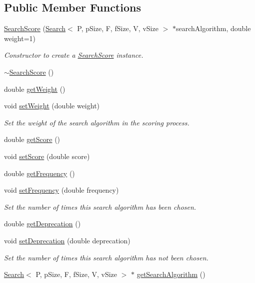 \subsection*{Public Member Functions}
\begin{DoxyCompactItemize}
\item 
\hyperlink{classSearchScore_a474b8d264518eac06879e0e8fa3668c3}{Search\+Score} (\hyperlink{classSearch}{Search}$<$ P, p\+Size, F, f\+Size, V, v\+Size $>$ $\ast$search\+Algorithm, double weight=1)
\begin{DoxyCompactList}\small\item\em Constructor to create a \hyperlink{classSearchScore}{Search\+Score} instance. \end{DoxyCompactList}\item 
\hyperlink{classSearchScore_ae19670231c559799e69ebc49b7a85ad8}{$\sim$\+Search\+Score} ()
\item 
double \hyperlink{classSearchScore_aa8a9d9b4946fc02c2243f38a226ae0e9}{get\+Weight} ()
\item 
void \hyperlink{classSearchScore_aaa8a0c4f0a91df62ccc7c8c1a6fc0612}{set\+Weight} (double weight)
\begin{DoxyCompactList}\small\item\em Set the weight of the search algorithm in the scoring process. \end{DoxyCompactList}\item 
double \hyperlink{classSearchScore_a909350808e091d0f75d43bbf08f6db29}{get\+Score} ()
\item 
void \hyperlink{classSearchScore_a9157d1aa13189eece5b1321c08316220}{set\+Score} (double score)
\item 
double \hyperlink{classSearchScore_a13ceb06fc95166e56edf0408f00bc73c}{get\+Frequency} ()
\item 
void \hyperlink{classSearchScore_a7dc57a564b84fbdbd18c1ead863659fb}{set\+Frequency} (double frequency)
\begin{DoxyCompactList}\small\item\em Set the number of times this search algorithm has been chosen. \end{DoxyCompactList}\item 
double \hyperlink{classSearchScore_ae3e584d54dc96f55f58c7acafbad9e87}{get\+Deprecation} ()
\item 
void \hyperlink{classSearchScore_a543ce1e47ae77983b415edb99588aa50}{set\+Deprecation} (double deprecation)
\begin{DoxyCompactList}\small\item\em Set the number of times this search algorithm has not been chosen. \end{DoxyCompactList}\item 
\hyperlink{classSearch}{Search}$<$ P, p\+Size, F, f\+Size, V, v\+Size $>$ $\ast$ \hyperlink{classSearchScore_a4a3bd7e51e9de5c7ff2ae9cf4b64d13d}{get\+Search\+Algorithm} ()
\end{DoxyCompactItemize}


